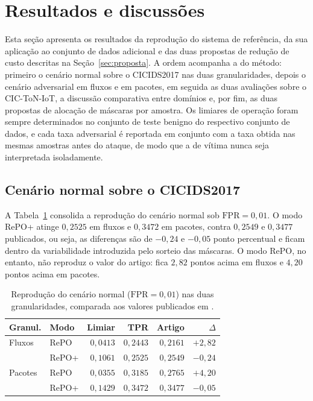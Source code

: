 \documentclass[conference]{IEEEtran}
\begin{document}
\section{Resultados e discussões}\label{sec:resultados}

Esta seção apresenta os resultados da reprodução do sistema de referência, da sua aplicação ao conjunto de dados adicional e das duas propostas de redução de custo descritas na Seção~\ref{sec:proposta}.
A ordem acompanha a do método: primeiro o cenário normal sobre o CICIDS2017 nas duas granularidades, depois o cenário adversarial em fluxos e em pacotes, em seguida as duas avaliações sobre o CIC-ToN-IoT, a discussão comparativa entre domínios e, por fim, as duas propostas de alocação de máscaras por amostra.
Os limiares de operação foram sempre determinados no conjunto de teste benigno do respectivo conjunto de dados, e cada taxa adversarial é reportada em conjunto com a taxa obtida nas mesmas amostras antes do ataque, de modo que a  de vítima nunca seja interpretada isoladamente.

\subsection{Cenário normal sobre o CICIDS2017}

A Tabela~\ref{tab:normal_resumo} consolida a reprodução do cenário normal sob $\text{FPR} = 0{,}01$.
O modo RePO+ atinge $0{,}2525$ em fluxos e $0{,}3472$ em pacotes, contra $0{,}2549$ e $0{,}3477$ publicados, ou seja, as diferenças são de $-0{,}24$ e $-0{,}05$ ponto percentual e ficam dentro da variabilidade introduzida pelo sorteio das máscaras.
O modo RePO, no entanto, não reproduz o valor do artigo: fica $2{,}82$ pontos acima em fluxos e $4{,}20$ pontos acima em pacotes.

\begin{table}[!t]
\centering
\footnotesize
\setlength{\tabcolsep}{3pt}
\caption{Reprodução do cenário normal ($\text{FPR} = 0{,}01$) nas duas granularidades, comparada aos valores publicados em \cite{hashemi2020}.}
\label{tab:normal_resumo}
\begin{tabular}{@{}llrrrr@{}}
\toprule
\textbf{Granul.} & \textbf{Modo} & \textbf{Limiar} & \textbf{TPR} & \textbf{Artigo} & \textbf{$\Delta$} \\
\midrule
Fluxos & RePO & $0{,}0413$ & $0{,}2443$ & $0{,}2161$ & $+2{,}82$ \\
 & RePO+ & $0{,}1061$ & $0{,}2525$ & $0{,}2549$ & $-0{,}24$ \\
\addlinespace
Pacotes & RePO & $0{,}0355$ & $0{,}3185$ & $0{,}2765$ & $+4{,}20$ \\
 & RePO+ & $0{,}1429$ & $0{,}3472$ & $0{,}3477$ & $-0{,}05$ \\
\bottomrule
\end{tabular}
\end{table}
\end{document}
